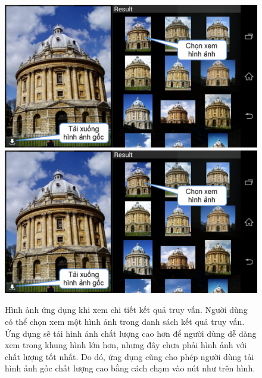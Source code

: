 \begin{figure}[!htbp]
  \begin{center}
    \leavevmode
    \ifpdf
      \includegraphics[scale=0.4]{interface_4}
    \else
      \includegraphics[scale=0.4]{interface_4}
    \fi
    \caption[Hình ảnh ứng dụng khi xem chi tiết kết quả truy vấn]{Hình ảnh ứng dụng khi xem chi tiết kết quả truy vấn. Người dùng có thể chọn xem một hình ảnh trong danh sách kết quả truy vấn. Ứng dụng sẽ tải hình ảnh chất lượng cao hơn để người dùng dễ dàng xem trong khung hình lớn hơn, nhưng đây chưa phải hình ảnh với chất lượng tốt nhất. Do dó, ứng dụng cũng cho phép người dùng tải hình ảnh gốc chất lượng cao bằng cách chạm vào nút như trên hình.}
    \label{FigInterface4}
  \end{center}
\end{figure}

